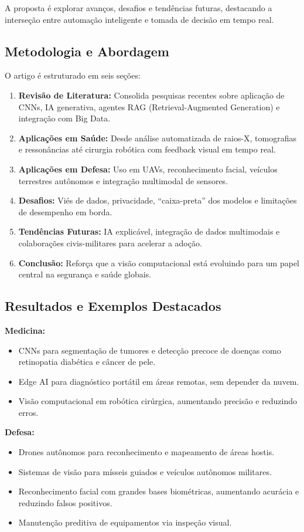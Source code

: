 \documentclass{article}
\begin{document}
A proposta é explorar avanços, desafios e tendências futuras, destacando a interseção entre automação inteligente e tomada de decisão em tempo real.

\subsection*{Metodologia e Abordagem}

O artigo é estruturado em seis seções:
\begin{enumerate}
    \item \textbf{Revisão de Literatura:} Consolida pesquisas recentes sobre aplicação de CNNs, IA generativa, agentes RAG (Retrieval-Augmented Generation) e integração com Big Data.
    \item \textbf{Aplicações em Saúde:} Desde análise automatizada de raios-X, tomografias e ressonâncias até cirurgia robótica com feedback visual em tempo real.
    \item \textbf{Aplicações em Defesa:} Uso em UAVs, reconhecimento facial, veículos terrestres autônomos e integração multimodal de sensores.
    \item \textbf{Desafios:} Viés de dados, privacidade, ``caixa-preta'' dos modelos e limitações de desempenho em borda.
    \item \textbf{Tendências Futuras:} IA explicável, integração de dados multimodais e colaborações civis-militares para acelerar a adoção.
    \item \textbf{Conclusão:} Reforça que a visão computacional está evoluindo para um papel central na segurança e saúde globais.
\end{enumerate}

\subsection*{Resultados e Exemplos Destacados}

\textbf{Medicina:}
\begin{itemize}
    \item CNNs para segmentação de tumores e detecção precoce de doenças como retinopatia diabética e câncer de pele.
    \item Edge AI para diagnóstico portátil em áreas remotas, sem depender da nuvem.
    \item Visão computacional em robótica cirúrgica, aumentando precisão e reduzindo erros.
\end{itemize}

\textbf{Defesa:}
\begin{itemize}
    \item Drones autônomos para reconhecimento e mapeamento de áreas hostis.
    \item Sistemas de visão para mísseis guiados e veículos autônomos militares.
    \item Reconhecimento facial com grandes bases biométricas, aumentando acurácia e reduzindo falsos positivos.
    \item Manutenção preditiva de equipamentos via inspeção visual.
\end{itemize}
\end{document}
